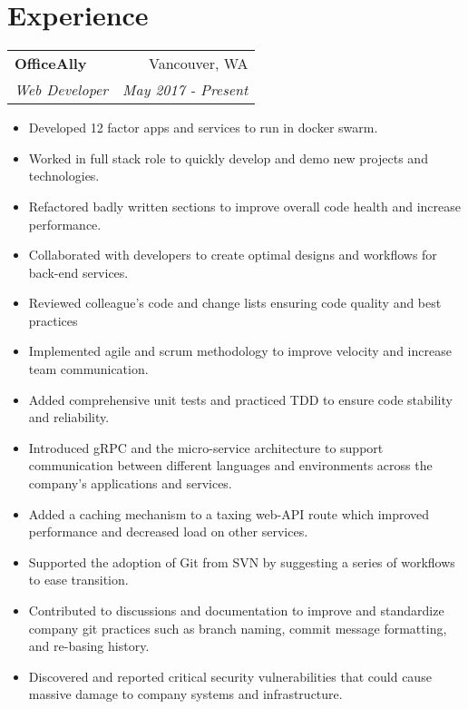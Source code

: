 \documentclass[letterpaper,12pt]{article}
\makeatletter
\newcommand{\resumeItem}[1]{
  \item\small{
      {#1 \vspace{-2pt}}
  }
}
\newcommand{\resumeSubheading}[4]{
  \vspace{-1pt}\item
    \begin{tabular*}{0.97\textwidth}{l@{\extracolsep{\fill}}r}
      \textbf{#1} & #2 \\
      \textit{\small#3} & \textit{\small #4} \\
    \end{tabular*}\vspace{-5pt}
}
\newcommand{\resumeSubHeadingListStart}{\begin{description}[leftmargin=*]}
\newcommand{\resumeSubHeadingListEnd}{\end{description}}
\newcommand{\resumeItemListStart}{\begin{itemize}}
\newcommand{\resumeItemListEnd}{\end{itemize}\vspace{-5pt}}
\makeatother
\begin{document}
\section{Experience}
\resumeSubHeadingListStart
    \resumeSubheading
    {OfficeAlly}{Vancouver, WA}
    {Web Developer}{May 2017 - Present}
        \resumeItemListStart
            \resumeItem
            {Developed 12 factor apps and services to run in docker swarm.}
            \resumeItem
            {Worked in full stack role to quickly develop and demo new projects and technologies.}
            \resumeItem
            {Refactored badly written sections to improve overall code health and increase performance.}
            \resumeItem
            {Collaborated with developers to create optimal designs and workflows for back-end services.}
            \resumeItem
            {Reviewed colleague's code and change lists ensuring code quality and best practices}
            \resumeItem
            {Implemented agile and scrum methodology to improve velocity and increase team communication.}
            \resumeItem
            {Added comprehensive unit tests and practiced TDD to ensure code stability and reliability.}
            \resumeItem
            {Introduced gRPC and the micro-service architecture to support communication between different languages and environments across the company's applications and services.}
            \resumeItem
            {Added a caching mechanism to a taxing web-API route which improved performance and decreased load on other services.}
            \resumeItem
            {Supported the adoption of Git from SVN by suggesting a series of workflows to ease transition.}
            \resumeItem
            {Contributed to discussions and documentation to improve and standardize company git practices such as branch naming, commit message formatting, and re-basing history.}
            \resumeItem
            {Discovered and reported critical security vulnerabilities that could cause massive damage to company systems and infrastructure.}
      \resumeItemListEnd
\resumeSubHeadingListEnd


\end{document}
